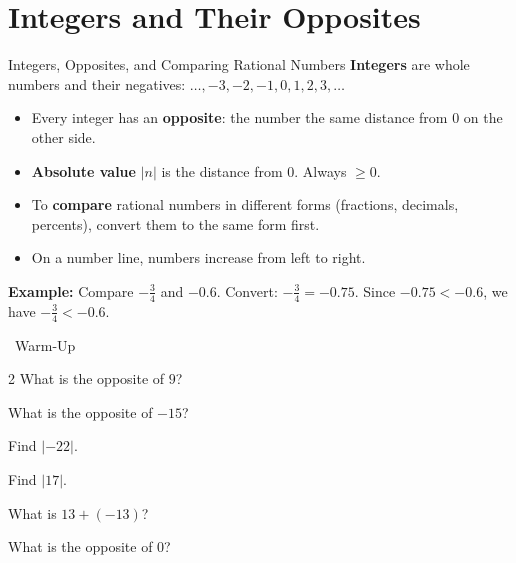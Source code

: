 \section{Integers and Their Opposites}

\begin{quickReview}{Integers, Opposites, and Comparing Rational Numbers}
\textbf{Integers} are whole numbers and their negatives: $\ldots, -3, -2, -1, 0, 1, 2, 3, \ldots$

\begin{itemize}[leftmargin=*]
    \item Every integer has an \textbf{opposite}: the number the same distance from $0$ on the other side.
    \item \textbf{Absolute value} $|n|$ is the distance from $0$. Always $\geq 0$.
    \item To \textbf{compare} rational numbers in different forms (fractions, decimals, percents), convert them to the same form first.
    \item On a number line, numbers increase from left to right.
\end{itemize}

\medskip
\textbf{Example:} Compare $-\frac{3}{4}$ and $-0.6$. Convert: $-\frac{3}{4} = -0.75$. Since $-0.75 < -0.6$, we have $-\frac{3}{4} < -0.6$.
\end{quickReview}

\begin{practiceBox}[funGreen]{\faSun~Warm-Up}


\begin{multicols}{2}
\prob What is the opposite of $9$? \answerBlank[2cm]

\prob What is the opposite of $-15$? \answerBlank[2cm]

\prob Find $|{-22}|$. \answerBlank[2cm]

\prob Find $|17|$. \answerBlank[2cm]

\prob What is $13 + (-13)$? \answerBlank[2cm]

\prob What is the opposite of $0$? \answerBlank[2cm]
\end{multicols}
\end{practiceBox}

